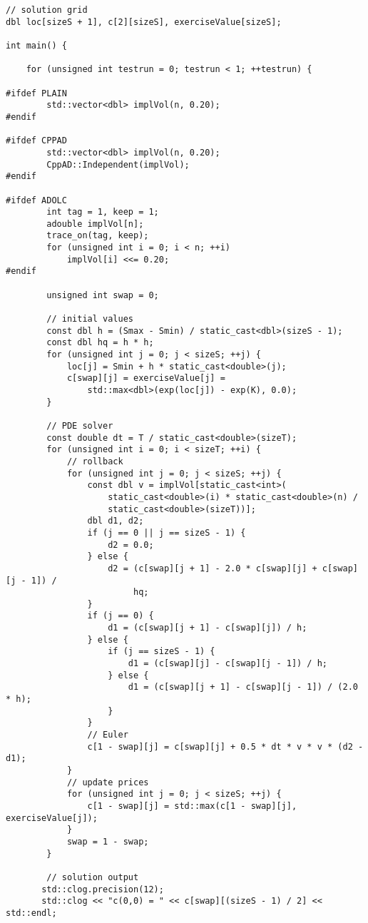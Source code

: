 \documentclass{amsart}
\theoremstyle{plain}
\numberwithin{equation}{section}
\begin{document}
\begin{appendix}
\begin{verbatim}
// solution grid
dbl loc[sizeS + 1], c[2][sizeS], exerciseValue[sizeS];

int main() {

    for (unsigned int testrun = 0; testrun < 1; ++testrun) {

#ifdef PLAIN
        std::vector<dbl> implVol(n, 0.20);
#endif

#ifdef CPPAD
        std::vector<dbl> implVol(n, 0.20);
        CppAD::Independent(implVol);
#endif

#ifdef ADOLC
        int tag = 1, keep = 1;
        adouble implVol[n];
        trace_on(tag, keep);
        for (unsigned int i = 0; i < n; ++i)
            implVol[i] <<= 0.20;
#endif

        unsigned int swap = 0;

        // initial values
        const dbl h = (Smax - Smin) / static_cast<dbl>(sizeS - 1);
        const dbl hq = h * h;
        for (unsigned int j = 0; j < sizeS; ++j) {
            loc[j] = Smin + h * static_cast<double>(j);
            c[swap][j] = exerciseValue[j] =
                std::max<dbl>(exp(loc[j]) - exp(K), 0.0);
        }

        // PDE solver
        const double dt = T / static_cast<double>(sizeT);
        for (unsigned int i = 0; i < sizeT; ++i) {
            // rollback
            for (unsigned int j = 0; j < sizeS; ++j) {
                const dbl v = implVol[static_cast<int>(
                    static_cast<double>(i) * static_cast<double>(n) /
                    static_cast<double>(sizeT))];
                dbl d1, d2;
                if (j == 0 || j == sizeS - 1) {
                    d2 = 0.0;
                } else {
                    d2 = (c[swap][j + 1] - 2.0 * c[swap][j] + c[swap][j - 1]) /
                         hq;
                }
                if (j == 0) {
                    d1 = (c[swap][j + 1] - c[swap][j]) / h;
                } else {
                    if (j == sizeS - 1) {
                        d1 = (c[swap][j] - c[swap][j - 1]) / h;
                    } else {
                        d1 = (c[swap][j + 1] - c[swap][j - 1]) / (2.0 * h);
                    }
                }
                // Euler
                c[1 - swap][j] = c[swap][j] + 0.5 * dt * v * v * (d2 - d1);
            }
            // update prices
            for (unsigned int j = 0; j < sizeS; ++j) {
                c[1 - swap][j] = std::max(c[1 - swap][j], exerciseValue[j]);
            }
            swap = 1 - swap;
        }

        // solution output
       std::clog.precision(12);
       std::clog << "c(0,0) = " << c[swap][(sizeS - 1) / 2] << std::endl;


\end{verbatim}
\end{appendix}
\end{document}
